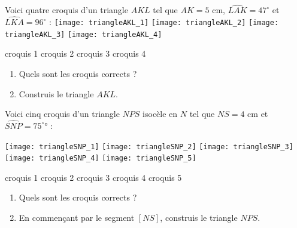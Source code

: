 \begin{activite}

Voici quatre croquis d'un triangle $AKL$ tel que $AK = 5$ cm, $\widehat{LAK} = 47^\circ$ et $\widehat{LKA} = 96^\circ$ :
\texttt{[image: triangleAKL\_1]} \hfill \texttt{[image: triangleAKL\_2]} \hfill \texttt{[image: triangleAKL\_3]} \hfill \texttt{[image: triangleAKL\_4]}

\qquad croquis 1 \hfill croquis 2 \hfill croquis 3 \hfill croquis 4 \hfill \\[1em]

\begin{enumerate}

\item Quels sont les croquis corrects ?

\item Construis le triangle $AKL$.
\end{enumerate}

\end{activite}



\begin{activite}

Voici cinq croquis d'un triangle $NPS$ isocèle en $N$ tel que $NS = 4$ cm et $\widehat{SNP} = 75^\circ°$ :

\texttt{[image: triangleSNP\_1]} \hfill \texttt{[image: triangleSNP\_2]} \hfill \texttt{[image: triangleSNP\_3]} \hfill \texttt{[image: triangleSNP\_4]} \hfill \texttt{[image: triangleSNP\_5]} 

\quad croquis 1 \hfill croquis 2 \hfill croquis 3 \hfill croquis 4 \hfill croquis 5 \\[1em]

\begin{enumerate}

\item Quels sont les croquis corrects ?

\item En commençant par le segment $[NS]$, construis le triangle $NPS$.
\end{enumerate}

\end{activite}
